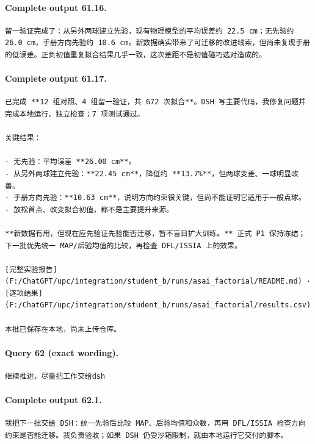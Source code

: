 \documentclass[UTF8,10pt]{ctexart}
\begin{document}
\paragraph{Complete output 61.16.}
\begin{Verbatim}[breaklines=true,breakanywhere=true,fontsize=\scriptsize,frame=single,framesep=2pt]
留一验证完成了：从另外两球建立先验，现有物理模型的平均误差约 22.5 cm；无先验约 26.0 cm，手册方向先验约 10.6 cm。新数据确实带来了可迁移的改进线索，但尚未复现手册的低误差。正负初值重复拟合结果几乎一致，这次差距不是初值碰巧选对造成的。
\end{Verbatim}

\paragraph{Complete output 61.17.}
\begin{Verbatim}[breaklines=true,breakanywhere=true,fontsize=\scriptsize,frame=single,framesep=2pt]
已完成 **12 组对照、4 组留一验证，共 672 次拟合**。DSH 写主要代码，我修复问题并完成本地运行、独立检查；7 项测试通过。

关键结果：

- 无先验：平均误差 **26.00 cm**。
- 从另外两球建立先验：**22.45 cm**，降低约 **13.7%**，但两球变差、一球明显改善。
- 手册方向先验：**10.63 cm**，说明方向约束很关键，但尚不能证明它适用于一般点球。
- 放松首点、改变拟合初值，都不是主要提升来源。

**新数据有用，但现在应先验证先验能否迁移，暂不盲目扩大训练。** 正式 P1 保持冻结；下一批优先统一 MAP/后验均值的比较，再检查 DFL/ISSIA 上的效果。

[完整实验报告](F:/ChatGPT/upc/integration/student_b/runs/asai_factorial/README.md) · [逐项结果](F:/ChatGPT/upc/integration/student_b/runs/asai_factorial/results.csv)

本批已保存在本地，尚未上传仓库。
\end{Verbatim}

\paragraph{Query 62 (exact wording).}
\begin{Verbatim}[breaklines=true,breakanywhere=true,fontsize=\scriptsize,frame=single,framesep=2pt]
继续推进，尽量把工作交给dsh
\end{Verbatim}

\paragraph{Complete output 62.1.}
\begin{Verbatim}[breaklines=true,breakanywhere=true,fontsize=\scriptsize,frame=single,framesep=2pt]
我把下一批交给 DSH：统一先验后比较 MAP、后验均值和众数，再用 DFL/ISSIA 检查方向约束是否能迁移。我负责验收；如果 DSH 仍受沙箱限制，就由本地运行它交付的脚本。
\end{Verbatim}
\end{document}
